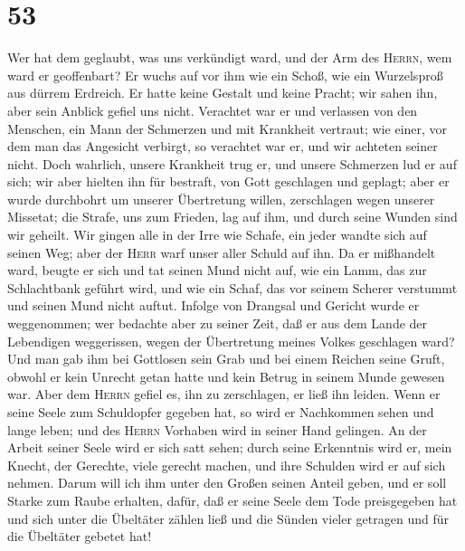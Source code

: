 \hypertarget{section-52}{%
\section{53}\label{section-52}}

 Wer hat dem geglaubt, was uns verkündigt ward, und der
Arm des \textsc{Herrn}, wem ward er geoffenbart?  Er wuchs
auf vor ihm wie ein Schoß, wie ein Wurzelsproß aus dürrem Erdreich. Er
hatte keine Gestalt und keine Pracht; wir sahen ihn, aber sein Anblick
gefiel uns nicht.  Verachtet war er und verlassen von den
Menschen, ein Mann der Schmerzen und mit Krankheit vertraut; wie einer,
vor dem man das Angesicht verbirgt, so verachtet war er, und wir
achteten seiner nicht.  Doch wahrlich, unsere Krankheit
trug er, und unsere Schmerzen lud er auf sich; wir aber hielten ihn für
bestraft, von Gott geschlagen und geplagt;  aber er wurde
durchbohrt um unserer Übertretung willen, zerschlagen wegen unserer
Missetat; die Strafe, uns zum Frieden, lag auf ihm, und durch seine
Wunden sind wir geheilt.  Wir gingen alle in der Irre wie
Schafe, ein jeder wandte sich auf seinen Weg; aber der \textsc{Herr}
warf unser aller Schuld auf ihn.  Da er mißhandelt ward,
beugte er sich und tat seinen Mund nicht auf, wie ein Lamm, das zur
Schlachtbank geführt wird, und wie ein Schaf, das vor seinem Scherer
verstummt und seinen Mund nicht auftut.  Infolge von
Drangsal und Gericht wurde er weggenommen; wer bedachte aber zu seiner
Zeit, daß er aus dem Lande der Lebendigen weggerissen, wegen der
Übertretung meines Volkes geschlagen ward?  Und man gab
ihm bei Gottlosen sein Grab und bei einem Reichen seine Gruft, obwohl er
kein Unrecht getan hatte und kein Betrug in seinem Munde gewesen war.
 Aber dem \textsc{Herrn} gefiel es, ihn zu zerschlagen,
er ließ ihn leiden. Wenn er seine Seele zum Schuldopfer gegeben hat, so
wird er Nachkommen sehen und lange leben; und des \textsc{Herrn}
Vorhaben wird in seiner Hand gelingen.  An der Arbeit
seiner Seele wird er sich satt sehen; durch seine Erkenntnis wird er,
mein Knecht, der Gerechte, viele gerecht machen, und ihre Schulden wird
er auf sich nehmen.  Darum will ich ihm unter den Großen
seinen Anteil geben, und er soll Starke zum Raube erhalten, dafür, daß
er seine Seele dem Tode preisgegeben hat und sich unter die Übeltäter
zählen ließ und die Sünden vieler getragen und für die Übeltäter gebetet
hat!

